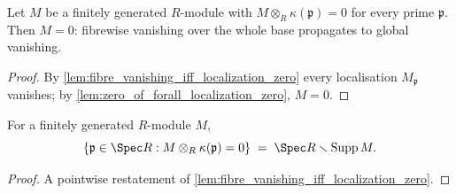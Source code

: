 \begin{theorem}
  \label{thm:fibrewise_vanishing_propagates}
  \leanok
  Let \(M\) be a finitely generated \(R\)-module with
  \(M \otimes_R \kappa(\mathfrak p) = 0\) for every prime \(\mathfrak p\). Then
  \(M = 0\): fibrewise vanishing over the whole base propagates to global vanishing.
\end{theorem}
\begin{proof}
  \leanok
  By \ref{lem:fibre_vanishing_iff_localization_zero} every localisation
  \(M_{\mathfrak p}\) vanishes; by \ref{lem:zero_of_forall_localization_zero},
  \(M = 0\).
\end{proof}

\begin{lemma}
  \label{lem:fibre_vanishing_locus_compl_support}
  \leanok
  For a finitely generated \(R\)-module \(M\),
  \[
    \{\mathfrak p \in \Spec R : M \otimes_R \kappa(\mathfrak p) = 0\}
    \;=\; \Spec R \smallsetminus \operatorname{Supp} M .
  \]
\end{lemma}
\begin{proof}
  \leanok
  A pointwise restatement of \ref{lem:fibre_vanishing_iff_localization_zero}.
\end{proof}

